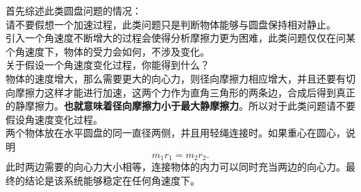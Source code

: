 \begin{casetypebox}[title={\strut\textcolor{white}{\bfseries 常见题型：水平圆盘、两侧物体、重心在圆心}}]
  首先综述此类圆盘问题的情况：\\
  请不要假想一个加速过程，此类问题只是判断物体能够与圆盘保持相对静止。\\
  引入一个角速度不断增大的过程会使得分析摩擦力更为困难，此类问题仅仅在问某个角速度下，物体的受力会如何，不涉及变化。\\
  关于假设一个角速度变化过程，你能得到什么？\\
  物体的速度增大，那么需要更大的向心力，则径向摩擦力相应增大，并且还要有切向摩擦力这样才能进行加速，这两个力作为直角三角形的两条边，合成后得到真正的静摩擦力。\textbf{也就意味着径向摩擦力小于最大静摩擦力}。所以对于此类问题请不要假设角速度变化过程。\\
  两个物体放在水平圆盘的同一直径两侧，并且用轻绳连接时。如果重心在圆心，说明
  \[
    m_1r_1=m_2r_2.
  \]
  此时两边需要的向心力大小相等，连接物体的内力可以同时充当两边的向心力。最终的结论是该系统能够稳定在任何角速度下。
\end{casetypebox}

